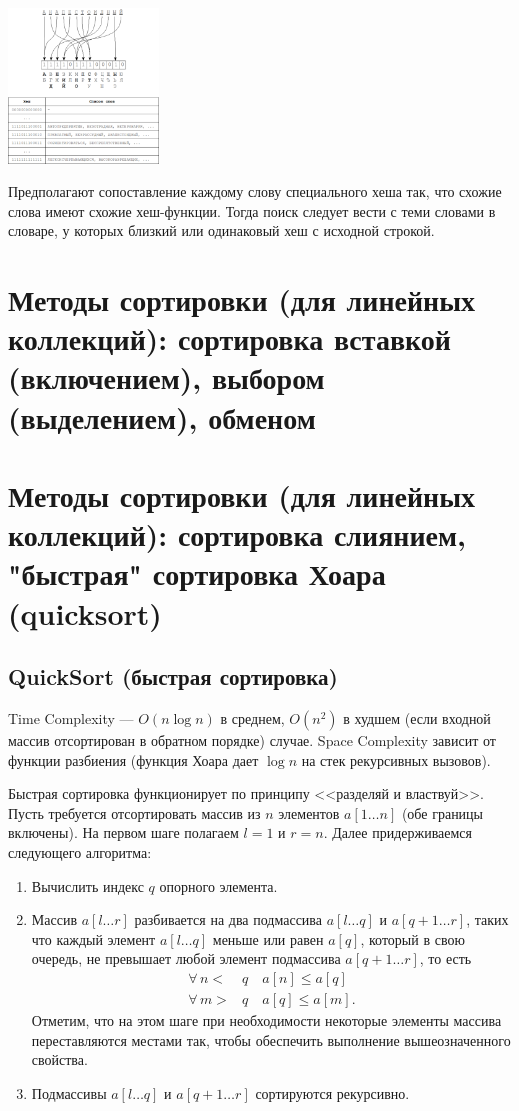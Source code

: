 \begin{center}
  \includegraphics[width=0.3\textwidth]{resources/19-26/hash.png}
\end{center}
Предполагают сопоставление каждому слову специального хеша так, что схожие слова имеют схожие хеш-функции. Тогда поиск следует вести с
теми словами в словаре, у которых близкий или одинаковый хеш с исходной строкой.
\section{Методы сортировки (для линейных коллекций): сортировка вставкой (включением), выбором (выделением), обменом}
\section{Методы сортировки (для линейных коллекций): сортировка слиянием, "быстрая" сортировка Хоара (quicksort)}
\subsection{QuickSort (быстрая сортировка)}
Time Complexity --- $O(n\log n)$ в среднем, $O(n^2)$
в худшем (если входной массив отсортирован в обратном порядке) случае.
Space Complexity зависит от функции разбиения (функция Хоара дает $\log n$ на стек рекурсивных вызовов).

Быстрая сортировка функционирует по принципу <<разделяй и властвуй>>.
Пусть требуется отсортировать массив из $n$ элементов $a[1\dots n]$ (обе границы включены).
На первом шаге полагаем $l=1$ и $r=n$. Далее придерживаемся следующего алгоритма:
\begin{enumerate}
  \item Вычислить индекс $q$ опорного элемента.
  \item Массив $a[l\dots r]$
  разбивается на два подмассива $a[l\dots q]$ и $a[q+1\dots r]$, таких что каждый элемент $a[l\dots q]$
  меньше или равен $a[q]$, который в свою очередь, не превышает любой элемент подмассива $a[q+1\dots r]$, то есть
  \begin{align*}
    \forall\, n <&q \quad a[n] \leq a[q] \\
    \forall\, m >&q \quad a[q] \leq a[m].
  \end{align*}
  Отметим, что на этом шаге при необходимости некоторые элементы массива переставляются местами так,
  чтобы обеспечить выполнение вышеозначенного свойства.
  \item Подмассивы $a[l\dots q]$ и $a[q+1\dots r]$ сортируются рекурсивно.
\end{enumerate}

